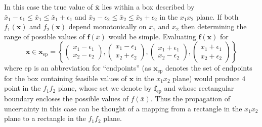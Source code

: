 In this case the true value of $\bar{\mathbf{x}}$ lies within a box described by $\bar{x}_1 - \epsilon_1 \le \bar{x}_1 \le \bar{x}_1 + \epsilon_1$ and $\bar{x}_2 - \epsilon_2 \le \bar{x}_2 \le \bar{x}_2 + \epsilon_2$ in the $x_1x_2$ plane. If both $f_1(\mathbf{x})$ and $f_2(\mathbf{x})$ depend monotonically on $x_1$ and $x_2$ then determining the range of possible values of $\mathbf{f}(\bar{x})$ would be simple. Evaluating $\mathbf{f}(\mathbf{x})$ for 
\begin{equation} \label{eq:endpoints}
\mathbf{x} \in \mathbf{x}_\mathrm{ep}
  = \left\lbrace
    \begin{pmatrix} x_1 - \epsilon_1 \\ x_2 - \epsilon_2 \end{pmatrix},
    \begin{pmatrix} x_1 - \epsilon_1 \\ x_2 + \epsilon_2 \end{pmatrix},
    \begin{pmatrix} x_1 + \epsilon_1 \\ x_2 - \epsilon_2 \end{pmatrix},
    \begin{pmatrix} x_1 + \epsilon_1 \\ x_2 + \epsilon_2 \end{pmatrix}
  \right\rbrace
\end{equation}
where $\mathrm{ep}$ is an abbreviation for ``endpoints'' (as $\mathbf{x}_\mathrm{ep}$ denotes the set of endpoints for the box containing feasible values of $\mathbf{x}$ in the $x_1x_2$ plane) would produce $4$ point in the $f_1f_2$ plane, whose set we denote by $\mathbf{f}_\mathrm{ep}$ and whose rectangular boundary encloses the possible values of $f(\bar{x})$. Thus the propagation of uncertainty in this case can be thought of a mapping from a rectangle in the $x_1x_2$ plane to a rectangle in the $f_1f_2$ plane.

